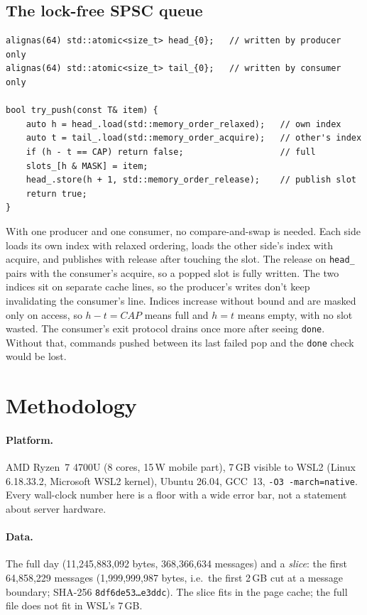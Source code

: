 \documentclass[10pt,a4paper]{article}
\newcommand{\code}[1]{\texttt{#1}}
\begin{document}
\subsection{The lock-free SPSC queue}
\begin{lstlisting}
alignas(64) std::atomic<size_t> head_{0};   // written by producer only
alignas(64) std::atomic<size_t> tail_{0};   // written by consumer only

bool try_push(const T& item) {
    auto h = head_.load(std::memory_order_relaxed);   // own index
    auto t = tail_.load(std::memory_order_acquire);   // other's index
    if (h - t == CAP) return false;                   // full
    slots_[h & MASK] = item;
    head_.store(h + 1, std::memory_order_release);    // publish slot
    return true;
}
\end{lstlisting}
With one producer and one consumer, no compare-and-swap is needed. Each side loads its own index with relaxed ordering,
loads the other side's index with acquire, and publishes with release after touching the slot. The release on \code{head\_} pairs with the consumer's
acquire, so a popped slot is fully written. The two indices sit on separate cache lines, so the producer's writes don't
keep invalidating the consumer's line. Indices increase without bound and are masked only on access, so $h-t=\textit{CAP}$ means full and
$h=t$ means empty, with no slot wasted. The consumer's exit protocol drains once more after seeing \code{done}. Without that, commands pushed
between its last failed pop and the \code{done} check would be lost.

\section{Methodology}
\label{sec:method}
\paragraph{Platform.} AMD Ryzen~7 4700U (8 cores, 15\,W mobile part), 7\,GB visible to WSL2
(Linux 6.18.33.2, Microsoft WSL2 kernel), Ubuntu 26.04, GCC~13, \code{-O3 -march=native}.
Every wall-clock number here is a floor with a wide error bar, not a statement about server hardware.

\paragraph{Data.} The full day (11{,}245{,}883{,}092 bytes, 368{,}366{,}634 messages) and a \emph{slice}:
the first 64{,}858{,}229 messages (1{,}999{,}999{,}987 bytes, i.e.\ the first 2\,GB cut at a message boundary;
SHA-256 \code{8df6de53\ldots e3ddc}). The slice fits in the page cache; the full file does not fit in WSL's 7\,GB.
\end{document}
